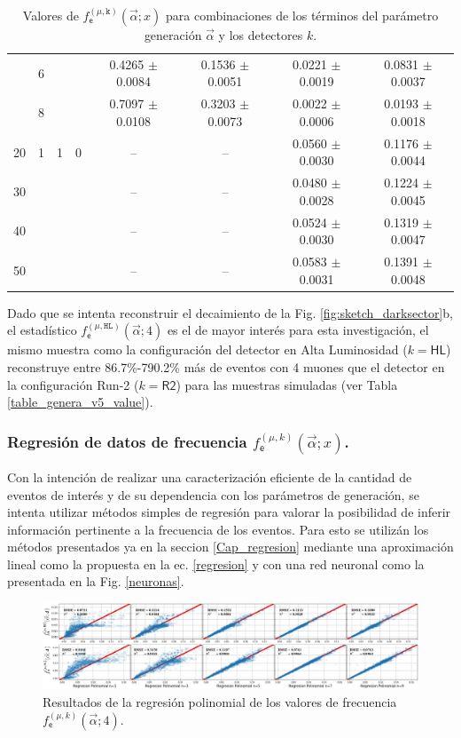 \begin{table}[!t]
\begin{tabular}{|cccccccc|}
& 6 & & & 0.4265 $\pm$ 0.0084 & 0.1536 $\pm$ 0.0051 & 0.0221 $\pm$ 0.0019 & 0.0831 $\pm$ 0.0037\\
& 8 & & & 0.7097 $\pm$ 0.0108 & 0.3203 $\pm$ 0.0073 & 0.0022 $\pm$ 0.0006 & 0.0193 $\pm$ 0.0018\\
\hline
20 & 1 & 1 & 0 & -- & -- & 0.0560 $\pm$ 0.0030 & 0.1176 $\pm$ 0.0044 \\
30 & & & &  --  & -- & 0.0480 $\pm$ 0.0028 & 0.1224 $\pm$ 0.0045\\
40 & & & & -- & -- &  0.0524 $\pm$ 0.0030 &  0.1319 $\pm$ 0.0047 \\
50 & & & & -- & -- & 0.0583 $\pm$ 0.0031 & 0.1391 $\pm$ 0.0048 \\
\hline
\end{tabular}
\caption{Valores de $f^{(\mu, \texttt{k})}_\textsf{e} (\vec{\alpha}; x)$ para combinaciones de los términos del parámetro generación $\vec{\alpha}$ y los detectores $k$.}
\label{Numero_de_Entradas}
\end{table}

Dado que se intenta reconstruir el decaimiento de la Fig. \ref{fig:sketch_darksector}b, el estadístico $f^{(\mu, \texttt{HL})}_\textsf{e} (\vec{\alpha}; 4)$ es el de mayor interés para esta investigación, el mismo muestra como la configuración del detector en Alta Luminosidad ($k=\textsf{HL}$) reconstruye entre 86.7\%-790.2\% más de eventos con 4 muones que el detector en la configuración Run-2 ($k=\textsf{R2}$) para las muestras simuladas (ver Tabla \ref{table_genera_v5_value}).





\subsubsection{Regresión de datos de frecuencia $f^{(\mu, k)}_\textsf{e} (\vec{\alpha}; x)$.}

Con la intención de realizar una caracterización eficiente de la cantidad de eventos de interés y de su dependencia con los parámetros de generación, se intenta utilizar métodos simples de regresión para valorar la posibilidad de inferir información pertinente a la frecuencia de los eventos. Para esto se utilizán los métodos presentados ya en la seccion \ref{Cap_regresion} mediante una aproximación lineal como la propuesta en la ec. \ref{regresion} y con una red neuronal como la presentada en la Fig. \ref{neuronas}.

\begin{figure}[!ht]
\centering
\includegraphics[width=1\textwidth]{Simulacion/imagenes/ML_Entries3.png}
\caption{Resultados de la regresión polinomial de los valores de frecuencia $f^{(\mu, k)}_\textsf{e} (\vec{\alpha}; 4)$.}
\label{regresionALL}
\end{figure}


